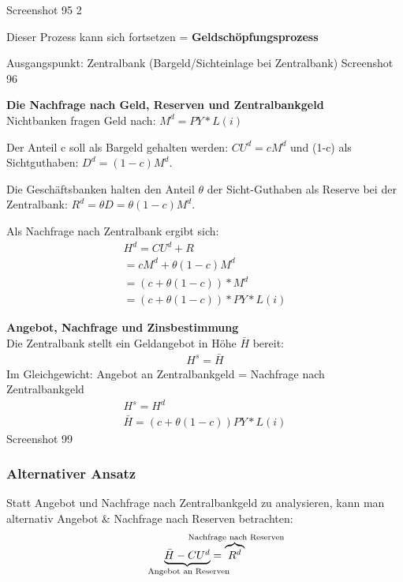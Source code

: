 \documentclass[11pt]{article}
\begin{document}
Screenshot 95 2

Dieser Prozess kann sich fortsetzen = \textbf{Geldschöpfungsprozess}

Ausgangspunkt: Zentralbank (Bargeld/Sichteinlage bei Zentralbank)
Screenshot 96

\textbf{Die Nachfrage nach Geld, Reserven und Zentralbankgeld}\\
Nichtbanken fragen Geld nach: \(M^d = PY * L(i)\)

Der Anteil c soll als Bargeld gehalten werden: \(CU^d = cM^d\)
und (1-c) als Sichtguthaben: \(D^d=(1-c)M^d\).

Die Geschäftsbanken halten den Anteil \(\theta\) der Sicht-Guthaben als Reserve bei der Zentralbank: \(R^d = \theta D= \theta (1-c)M^d\).

Als Nachfrage nach Zentralbank ergibt sich:
\begin{equation*}
\begin{aligned}
H^d = C U^d + R\\
= c M^d + \theta(1-c)M^d\\
= (c + \theta (1-c))*M^d\\
= (c + \theta (1-c))*PY * L(i)
\end{aligned}
\end{equation*}

\textbf{Angebot, Nachfrage und Zinsbestimmung}\\
Die Zentralbank stellt ein Geldangebot in Höhe \(\bar{H}\) bereit:
\begin{equation*}
\begin{aligned}
H^s = \bar{H}
\end{aligned}
\end{equation*}
Im Gleichgewicht: Angebot an Zentralbankgeld = Nachfrage nach Zentralbankgeld 
\begin{equation*}
\begin{aligned}
H^s = H^d\\
\bar{H} = (c+\theta (1-c))PY * L(i)
\end{aligned}
\end{equation*}
Screenshot 99

\subsubsection{Alternativer Ansatz}
\label{sec:org192275a}
Statt Angebot und Nachfrage nach Zentralbankgeld zu analysieren, kann man alternativ Angebot \& Nachfrage nach Reserven betrachten:
\begin{equation*}
\begin{aligned}
{\underbrace{\textstyle \bar{H} - CU^d}_{\mathclap{\text{ Angebot an Reserven}}}} = {\overbrace{\textstyle R^d}^{\mathclap{\text{ Nachfrage nach Reserven}}}}
\end{aligned}
\end{equation*}
\end{document}
